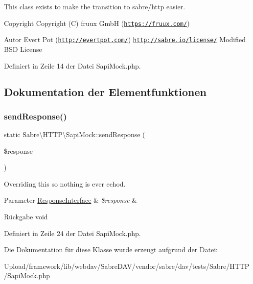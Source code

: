 This class exists to make the transition to sabre/http easier.

\begin{DoxyCopyright}{Copyright}
Copyright (C) fruux GmbH (\href{https://fruux.com/}{\tt https\+://fruux.\+com/}) 
\end{DoxyCopyright}
\begin{DoxyAuthor}{Autor}
Evert Pot (\href{http://evertpot.com/}{\tt http\+://evertpot.\+com/})  \href{http://sabre.io/license/}{\tt http\+://sabre.\+io/license/} Modified B\+SD License 
\end{DoxyAuthor}


Definiert in Zeile 14 der Datei Sapi\+Mock.\+php.



\subsection{Dokumentation der Elementfunktionen}
\mbox{\label{class_sabre_1_1_h_t_t_p_1_1_sapi_mock_aaaefcf46773df9c4e03f0557ed77b47d}} 
\subsubsection{\texorpdfstring{send\+Response()}{sendResponse()}}
{\footnotesize\ttfamily static Sabre\textbackslash{}\+H\+T\+T\+P\textbackslash{}\+Sapi\+Mock\+::send\+Response (\begin{DoxyParamCaption}\item[{\mbox{\hyperlink{interface_sabre_1_1_h_t_t_p_1_1_response_interface}{Response\+Interface}}}]{\$response }\end{DoxyParamCaption})\hspace{0.3cm}{\ttfamily [static]}}

Overriding this so nothing is ever echo\textquotesingle{}d.


\begin{DoxyParams}[1]{Parameter}
\mbox{\hyperlink{interface_sabre_1_1_h_t_t_p_1_1_response_interface}{Response\+Interface}} & {\em \$response} & \\
\hline
\end{DoxyParams}
\begin{DoxyReturn}{Rückgabe}
void 
\end{DoxyReturn}


Definiert in Zeile 24 der Datei Sapi\+Mock.\+php.



Die Dokumentation für diese Klasse wurde erzeugt aufgrund der Datei\+:\begin{DoxyCompactItemize}
\item 
Upload/framework/lib/webdav/\+Sabre\+D\+A\+V/vendor/sabre/dav/tests/\+Sabre/\+H\+T\+T\+P/Sapi\+Mock.\+php\end{DoxyCompactItemize}
